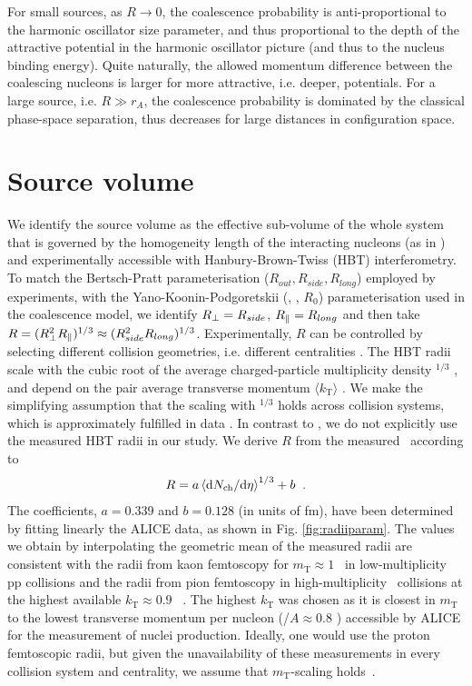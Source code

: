 For small sources, as $R \rightarrow 0$, the coalescence probability is anti-proportional to the harmonic oscillator size parameter, and thus proportional to the depth of the attractive potential in the harmonic oscillator picture (and thus to the nucleus binding energy).
Quite naturally, the allowed momentum difference between the coalescing nucleons is larger for more attractive, i.e. deeper, potentials. 
For a large source, i.e. $R \gg r_A$, the coalescence probability is dominated by the classical phase-space separation, thus decreases for large distances in configuration space. 
%

\section{Source volume} \label{SecSourceVolume}
We identify the source volume as the effective sub-volume of the whole system that is governed by the homogeneity length of the interacting nucleons (as in \cite{Scheibl:1998tk}) and experimentally accessible with Hanbury-Brown-Twiss (HBT) interferometry. 
To match the Bertsch-Pratt parameterisation ($R_{out}, R_{side}, R_{long}$) employed by experiments, with the Yano-Koonin-Podgoretskii (\rperp, \rpar, $R_{0}$) parameterisation used in the coalescence model,  we identify $R_{\perp} = R_{side}$, $R_{\|} = R_{long}$ and then take $R = (R_{\perp}^{2}R_{\|})^{1/3} \approx (R_{side}^{2}R_{long})^{1/3}$.
%
Experimentally, $R$ can be controlled by selecting different collision geometries, i.e. different centralities \cite{Abelev:2013qoq}. 
The HBT radii scale with the cubic root of the average charged-particle multiplicity density \avdNdeta$^{1/3}$ \cite{Adam:2015vna}, and depend on the pair average transverse momentum $\langle k_{\mathrm{T}}\rangle$ \cite{Aamodt:2011mr}. We make the simplifying assumption that the scaling with \avdNdeta$^{1/3}$ holds across collision systems, which is approximately fulfilled in data \cite{Adam:2015pya}. 
In contrast to \cite{Blum:2017qnn}, we do not explicitly use the measured HBT radii in our study. We derive $R$ from the measured \avdNdeta~according to
%
\begin{equation}
R = a \left<\mathrm{d}N_\mathrm{ch}/\mathrm{d}\eta\right>^{1/3} + b \;\;.
\label{eq:radiusParameterisation}
\end{equation}
%
The coefficients, $a = 0.339$ and $b = 0.128$ (in units of fm), have been determined by fitting linearly the ALICE data, as shown in Fig. \ref{fig:radiiparam}. 
The values we obtain by interpolating the geometric mean of the measured radii are consistent with the radii from kaon femtoscopy for $m_{\mathrm{T}} \approx 1$ \GeVc~in low-multiplicity pp collisions \cite{Abelev:2012sq} and the radii from pion femtoscopy in high-multiplicity \PbPb~collisions at the highest available $k_{\mathrm{T}} \approx 0.9$ \GeVc~\cite{Adam:2015vna}. 
The highest $k_{\mathrm{T}}$ was chosen as it is closest in $m_{\mathrm{T}}$ to the lowest transverse momentum per nucleon (\pt/$A \approx 0.8$ \GeVc) accessible by ALICE for the measurement of nuclei production. 
Ideally, one would use the proton femtoscopic radii, but given the unavailability of these measurements in every collision system and centrality, we assume that $m_{\mathrm{T}}$-scaling holds~\cite{Adam:2015vja}. 

